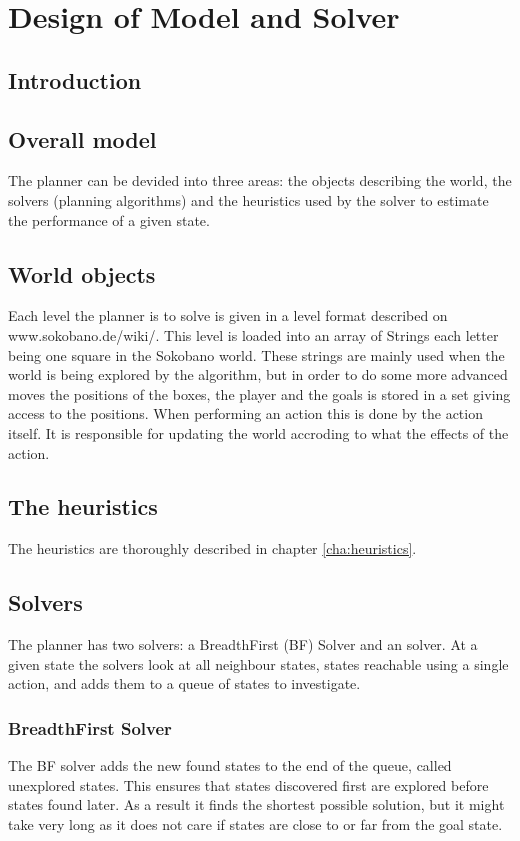 \chapter{Design of Model and Solver}
\label{cha:design}

\section{Introduction}

\section{Overall model}
The planner can be devided into three areas: the objects describing the world, the solvers (planning algorithms) and the heuristics used by the \astar solver to estimate the performance of a given state.

\section{World objects}
Each level the planner is to solve is given in a level format described on www.sokobano.de/wiki/. This level is loaded into an array of Strings each letter being one square in the Sokobano world. These strings are mainly used when the world is being explored by the algorithm, but in order to do some more advanced moves the positions of the boxes, the player and the goals is stored in a set giving access to the positions.
When performing an action this is done by the action itself. It is responsible for updating the world accroding to what the effects of the action.

\section{The heuristics}
The heuristics are thoroughly described in chapter \ref{cha:heuristics}.

\section{Solvers}
The planner has two solvers: a BreadthFirst (BF) Solver and an \astar solver. At a given state the solvers look at all neighbour states, states reachable using a single action, and adds them to a queue of states to investigate.

\subsection{BreadthFirst Solver}
The BF solver adds the new found states to the end of the queue, called unexplored states. This ensures that states discovered first are explored before states found later. As a result it finds the shortest possible solution, but it might take very long as it does not care if states are close to or far from the goal state.

